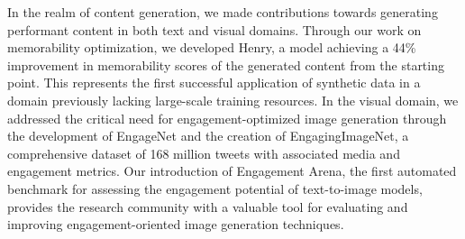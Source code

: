 In the realm of content generation, we made contributions towards generating performant content in both text and visual domains. Through our work on memorability optimization, we developed Henry, a model achieving a 44\% improvement in memorability scores of the generated content from the starting point. This represents the first successful application of synthetic data in a domain previously lacking large-scale training resources. In the visual domain, we addressed the critical need for engagement-optimized image generation through the development of EngageNet and the creation of EngagingImageNet, a comprehensive dataset of 168 million tweets with associated media and engagement metrics. Our introduction of Engagement Arena, the first automated benchmark for assessing the engagement potential of text-to-image models, provides the research community with a valuable tool for evaluating and improving engagement-oriented image generation techniques.


